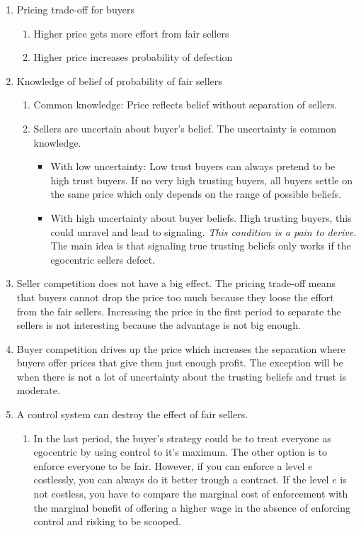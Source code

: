 \documentclass{article}
\begin{document}
\begin{enumerate}
    \item Pricing trade-off for buyers
    \begin{enumerate}
        \item Higher price gets more effort from fair sellers
        \item Higher price increases probability of defection
    \end{enumerate}
    \item Knowledge of belief of probability of fair sellers
    \begin{enumerate}
        \item Common knowledge: Price reflects belief without separation of sellers. 
        \item Sellers are uncertain about buyer's belief. The uncertainty is common knowledge.
        \begin{itemize}
            \item With low uncertainty: Low trust buyers can always pretend to be high trust buyers. If no very high trusting buyers, all buyers settle on the same price which only depends on the range of possible beliefs. 
            \item With high uncertainty about buyer beliefs. High trusting buyers, this could unravel and lead to signaling. \emph{This condition is a pain to derive}. The main idea is that signaling true trusting beliefs only works if the egocentric sellers defect.
        \end{itemize}
    \end{enumerate}
    \item Seller competition does not have a big effect. The pricing trade-off means that buyers cannot drop the price too much because they loose the effort from the fair sellers. Increasing the price in the first period to separate the sellers is not interesting because the advantage is not big enough.
    \item Buyer competition drives up the price which increases the separation where buyers offer prices that give them just enough profit. The exception will be when there is not a lot of uncertainty about the trusting beliefs and trust is moderate.
    \item A control system can destroy the effect of fair sellers.
    \begin{enumerate}
        \item In the last period, the buyer's strategy could be to treat everyone as egocentric by using control to it's maximum. The other option is to enforce everyone to be fair. However, if you can enforce a level $e$ costlessly, you can always do it better trough a contract. If the level $e$ is not costless, you have to compare the marginal cost of enforcement with the marginal benefit of offering a higher wage in the absence of enforcing control and risking to be scooped. 

\end{enumerate}
\end{enumerate}
\end{document}
